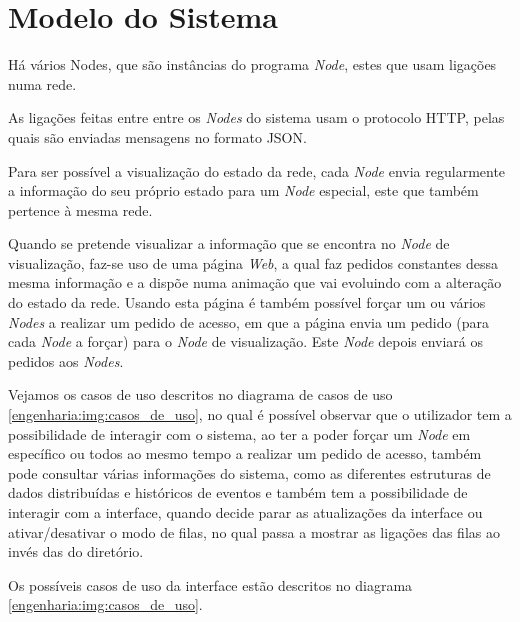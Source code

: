 \section{Modelo do Sistema}

Há vários Nodes, que são instâncias do programa \emph{Node}, estes que usam ligações numa rede.

As ligações feitas entre entre os \emph{Nodes} do sistema usam o protocolo \acs*{HTTP}, pelas quais são
enviadas mensagens no formato \acs*{JSON}.

Para ser possível a visualização do estado da rede, cada \emph{Node} envia regularmente a informação do
seu próprio estado para um \emph{Node} especial, este que também pertence à mesma rede.

Quando se pretende visualizar a informação que se encontra no \emph{Node} de visualização, faz-se uso de
uma página \emph{Web}, a qual faz pedidos constantes dessa mesma informação e a dispõe numa animação que 
vai evoluindo com a alteração do estado da rede.
Usando esta página é também possível forçar um ou vários \emph{Nodes}
a realizar um pedido de acesso, em que a página envia um pedido (para cada \emph{Node} a forçar) para o \emph{Node} de visualização.
Este \emph{Node} depois enviará os pedidos aos \emph{Nodes}. 

Vejamos os casos de uso descritos no diagrama de casos de uso \ref{engenharia:img:casos_de_uso}, 
no qual é possível observar que o utilizador tem a possibilidade de interagir com o sistema, ao ter a poder forçar
um \emph{Node} em específico ou todos ao mesmo tempo a realizar um pedido de acesso, também pode consultar várias informações do sistema,
como as diferentes estruturas de dados distribuídas e históricos de eventos e também tem a possibilidade de interagir com a interface, 
quando decide parar as atualizações da interface ou ativar/desativar o modo de filas, no qual passa a mostrar as ligações das filas ao invés
das do diretório.


Os possíveis casos de uso da interface estão descritos no diagrama \ref{engenharia:img:casos_de_uso}.


